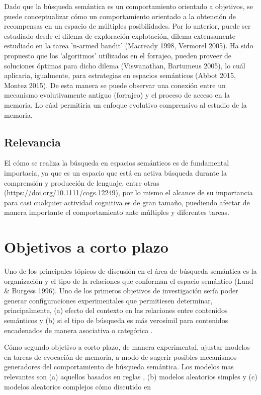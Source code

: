 \documentclass[11pt]{article}
\begin{document}
Dado que la búsqueda semántica es un comportamiento orientado a
objetivos, se puede conceptualizar cómo un comportamiento orientado a
la obtención de recompensas en un espacio de múltiples
posibilidades. Por lo anterior, puede ser estudiado desde el dilema de
exploración-explotación, dilema extensamente estudiado en la tarea
'n-armed bandit' (Macready 1998, Vermorel 2005). Ha sido propuesto que
los 'algoritmos' utilizados en el forrajeo, pueden proveer de
soluciones óptimas para dicho dilema (Viswanathan, Bartumeus 2005), lo
cuál aplicaria, igualmente, para estrategias en espacios semánticos
(Abbot 2015, Montez 2015). De esta manera se puede observar una
conexión entre un mecanismo evolutivamente antiguo (forrajeo) y el
proceso de acceso en la memoria. Lo cúal permitiria un enfoque
evolutivo comprensivo al estudio de la memoria.
\subsection{Relevancia}
\label{sec:org2bf5f1d}
El cómo se realiza la búsqueda en espacios semánticos es de
fundamental importacia, ya que es un espacio que está en activa
búsqueda durante la comprensión y producción de lenguaje, entre otras
(\url{https://doi.org/10.1111/cogs.12249}), por lo mismo el alcance de su
importancia para casi cualquier actividad cognitiva es de gran tamaño,
puediendo afectar de manera importante el comportamiento ante múltiples y
diferentes tareas.
\section{Objetivos a corto plazo}
\label{sec:orga3951c7}
Uno de los principales tópicos de discusión en el área de búsqueda
semántica es la organización y el tipo de la relaciones que conforman
el espacio semántico (Lund \& Burgess 1996). Uno de los primeros
objetivos de investigación sería poder generar configuraciones
experimentales que permitiesen determinar, principalmente, (a) efecto
del contexto en las relaciones entre contenidos semánticos
\citep{schillerMemorySpaceUnderstanding2015} y (b) si el tipo de búsqueda es más
verosímil para contenidos encadenados de manera asociativa o categórica
\citep{hillsOptimalForagingSemantic2012}. 

Cómo segundo objetivo a corto plazo, de manera experimental, ajustar modelos en
tareas de evocación de memoria, a modo de sugerir posibles mecanismos
generadores del comportamiento de búsqueda semántica. Los modelos mas
relevantes son (a) aquellos basados en reglas \citep{charnovOptimalForagingMarginal1976}, (b)
modelos aleatorios simples \citep{thompsonWalkingWikipediaScalefree2014} y (c) modelos aleatorios
complejos cómo discutido en \citep{benhamouHowManyAnimals2007}  
\end{document}
